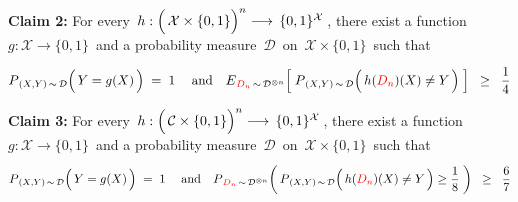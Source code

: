 \vskip 0.5cm
\noindent
\textbf{Claim 2:}\quad
For every
\,$h : \left(\,\mathcal{X}\overset{{\color{white}.}}{\times}\{0,1\}\right)^{n} \longrightarrow \,\{0,1\}^{\mathcal{X}}$\,,
there exist a function \,$g : \mathcal{X} \longrightarrow \{0,1\}$\, and
a probability measure \,$\mathcal{D}$\, on \,$\mathcal{X} \times \{0,1\}$\,
such that
\begin{equation*}
P_{\,(X,Y)\,\sim\,\mathcal{D}}\!\left(\,Y \overset{{\color{white}-}}{=} g(X)\,\right) \; = \; 1
\;\quad\textnormal{and}\quad
\overset{{\color{white}\vert}}{E}_{{\color{red}D_{n}}\,\sim\,\mathcal{D}^{\otimes n}}\!\left[\;
	P_{\,(X,Y)\,\sim\,\mathcal{D}}\!\left(\,h({\color{red}D_{n}})(X) \overset{{\color{white}.}}{\neq} Y\,\right)
	\;\right]
\;\; \geq \;\;
	\dfrac{1}{4}
\end{equation*}

\vskip 0.5cm
\noindent
\textbf{Claim 3:}\quad
For every
\,$h : \left(\,\mathcal{C}\overset{{\color{white}.}}{\times}\{0,1\}\right)^{n} \longrightarrow \,\{0,1\}^{\mathcal{X}}$\,,
there exist a function \,$g : \mathcal{X} \longrightarrow \{0,1\}$\, and
a probability measure \,$\mathcal{D}$\, on \,$\mathcal{X} \times \{0,1\}$\,
such that
\begin{equation*}
P_{\,(X,Y)\,\sim\,\mathcal{D}}\!\left(\,Y \overset{{\color{white}-}}{=} g(X)\,\right) \; = \; 1
\;\quad\textnormal{and}\quad
\overset{{\color{white}\vert}}{P}_{{\color{red}D_{n}}\,\sim\,\mathcal{D}^{\otimes n}}\!\left(\,
	P_{\,(X,Y)\,\sim\,\mathcal{D}}\!\left(\,h({\color{red}D_{n}})(X) \overset{{\color{white}.}}{\neq} Y\,\right) \geq \dfrac{1}{8}
	\;\right)
\;\; \geq \;\;
	\dfrac{6}{7}
\end{equation*}

